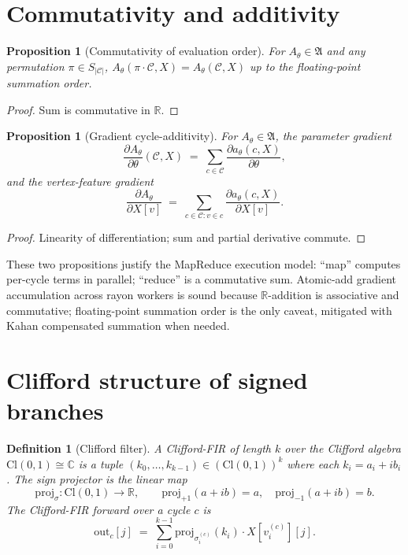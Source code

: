 \documentclass[11pt]{article}
\newtheorem{prop}[theorem]{Proposition}
\newtheorem{defn}[theorem]{Definition}
\begin{document}
\section{Commutativity and additivity}

\begin{prop}[Commutativity of evaluation order]
For $A_\theta \in \mathfrak{A}$ and any permutation
$\pi \in S_{|\mathcal{C}|}$,
$A_\theta(\pi \cdot \mathcal{C}, X) = A_\theta(\mathcal{C}, X)$
up to the floating-point summation order.
\end{prop}

\begin{proof}
Sum is commutative in $\mathbb{R}$.
\end{proof}

\begin{prop}[Gradient cycle-additivity]
For $A_\theta \in \mathfrak{A}$, the parameter gradient
\[
  \frac{\partial A_\theta}{\partial \theta}(\mathcal{C}, X)
  \;=\;
  \sum_{c \in \mathcal{C}} \frac{\partial a_\theta(c, X)}{\partial \theta},
\]
and the vertex-feature gradient
\[
  \frac{\partial A_\theta}{\partial X[v]}
  \;=\;
  \sum_{c \in \mathcal{C}: v \in c}
        \frac{\partial a_\theta(c, X)}{\partial X[v]}.
\]
\end{prop}

\begin{proof}
Linearity of differentiation; sum and partial derivative commute.
\end{proof}

These two propositions justify the MapReduce execution model:
``map'' computes per-cycle terms in parallel; ``reduce'' is a
commutative sum. Atomic-add gradient accumulation across rayon
workers is sound because $\mathbb{R}$-addition is associative and
commutative; floating-point summation order is the only caveat,
mitigated with Kahan compensated summation when needed.

\section{Clifford structure of signed branches}

\begin{defn}[Clifford filter]
A \emph{Clifford-FIR} of length $k$ over the Clifford algebra
$\mathrm{Cl}(0, 1) \cong \mathbb{C}$ is a tuple
$(k_0, \ldots, k_{k-1}) \in (\mathrm{Cl}(0,1))^k$ where each
$k_i = a_i + i b_i$. The \emph{sign projector} is the linear map
\[
  \mathrm{proj}_\sigma : \mathrm{Cl}(0, 1) \to \mathbb{R},
  \qquad
  \mathrm{proj}_{+1}(a + ib) = a, \quad \mathrm{proj}_{-1}(a + ib) = b.
\]
The Clifford-FIR forward over a cycle $c$ is
\[
  \mathrm{out}_c[j] \;=\; \sum_{i=0}^{k-1}
      \mathrm{proj}_{\sigma_i^{(c)}}(k_i) \cdot X[v_i^{(c)}][j].
\]
\end{defn}
\end{document}
